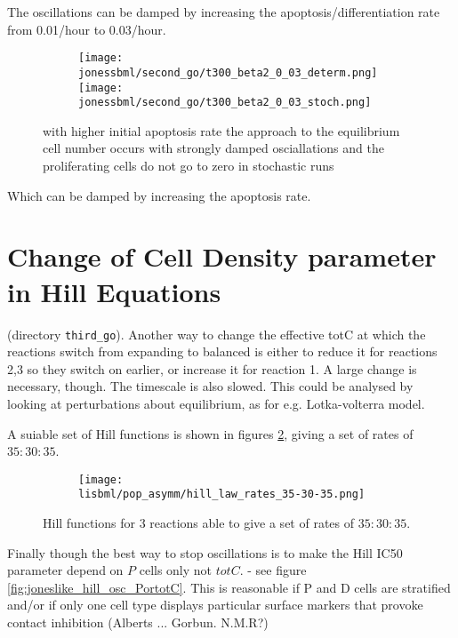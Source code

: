 \documentclass[a4paper,10pt]{report}
\newcommand{\psortbase}{/home/ngrs2/work/bsu/PSORT_Zuliani_Reynolds/}
\newcommand{\sbmlbase}{\psortbase/sbml-sh/}
\newcommand{\jonessbml}{\sbmlbase/jones_like}
\newcommand{\lisbml}{\sbmlbase/li_like}
\begin{document}
The oscillations can be damped by increasing the apoptosis/differentiation rate
from 0.01/hour to 0.03/hour.

\begin{figure}[h!]
  \begin{subfigure}{\textwidth}
    \texttt{[image: \\jonessbml/second\_go/t300\_beta2\_0\_03\_determ.png]}
    \texttt{[image: \\jonessbml/second\_go/t300\_beta2\_0\_03\_stoch.png]}
  \end{subfigure}
  \caption{with higher initial apoptosis rate the approach to the equilibrium cell number occurs with strongly damped osciallations and the proliferating cells do not go to zero in stochastic runs}
  \label{fig:joneslike_hill_damped_oscill}
\end{figure}


Which can be damped by increasing the apoptosis rate.


\section{Change of Cell Density parameter in Hill Equations}

(directory {\tt third\_go}). 
Another way to change the effective totC at which the reactions switch from expanding to balanced is  either to reduce it for reactions 2,3 so they switch on earlier, or increase it for reaction 1. A large change is necessary, though. The timescale is also slowed. This could be analysed by looking at perturbations about equilibrium, as for e.g. Lotka-volterra model. 

A suiable set of Hill functions is shown in figures \ref{fig:joneslike_hill_functions}, giving a set of rates of $35:30:35$. 

\begin{figure}[h!]
  \begin{subfigure}{\textwidth}
  \centering
    \texttt{[image: \\lisbml/pop\_asymm/hill\_law\_rates\_35-30-35.png]}
  \end{subfigure}
  \caption{Hill functions for 3 reactions able to  give a set of rates of $35:30:35$.}
  \label{fig:joneslike_hill_functions}
\end{figure}

Finally though the best way to stop oscillations is to make the Hill IC50 parameter depend on $P$ cells only not $totC$. - see figure \ref{fig:joneslike_hill_osc_PortotC}. This is reasonable if P and D cells are stratified and/or if only one cell type displays particular surface markers that provoke contact inhibition (Alberts ... Gorbun. N.M.R?)
\end{document}

